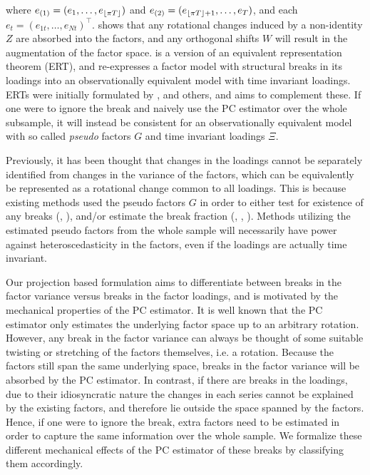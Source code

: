 \documentclass[12pt]{article}
\newcommand*{\tran}{\intercal}
\theoremstyle{plain}
\numberwithin{equation}{section}
\begin{document}
where $e_{(1)} = (e_{1}, \dots, e_{\left \lfloor \pi T \right \rfloor})$ and $e_{(2)} = (e_{\left \lfloor \pi T \right \rfloor + 1}, \dots, e_T)$, and each $e_t = (e_{1t}, \dots, e_{Nt})^\tran$.  shows that any rotational changes induced by a non-identity $Z$ are absorbed into the factors, and any orthogonal shifts $W$ will result in the augmentation of the factor space.  is a version of an equivalent representation theorem (ERT), and re-expresses a factor model with structural breaks in its loadings into an observationally equivalent model with time invariant loadings. ERTs were initially formulated by \textcite{han_tests_2015}, \textcite{baltagi_identification_2017} and others, and  aims to complement these. If one were to ignore the break and naively use the PC estimator over the whole subsample, it will instead be consistent for an observationally equivalent model with so called \emph{pseudo} factors $G$ and time invariant loadings $\Xi$.

Previously, it has been thought that changes in the loadings cannot be separately identified from changes in the variance of the factors, which can be equivalently be represented as a rotational change common to all loadings. This is because existing methods used the pseudo factors $G$ in order to either test for existence of any breaks (\textcite{han_tests_2015}, \textcite{chen_detecting_2014}), and/or estimate the break fraction (\textcite{baltagi_identification_2017}, \textcite{baltagi_estimating_2021}, \textcite{duan_quasi-maximum_2022}). 
Methods utilizing the estimated pseudo factors from the whole sample will necessarily have power against heteroscedasticity in the factors, even if the loadings are actually time invariant. 

Our projection based formulation aims to differentiate between breaks in the factor variance versus breaks in the factor loadings, and is motivated by the mechanical properties of the PC estimator. It is well known that the PC estimator only estimates the underlying factor space up to an arbitrary rotation. However, any break in the factor variance can always be thought of some suitable twisting or stretching of the factors themselves, i.e. a rotation. Because the factors still span the same underlying space, breaks in the factor variance will be absorbed by the PC estimator. In contrast, if there are breaks in the loadings, due to their idiosyncratic nature the changes in each series cannot be explained by the existing factors, and therefore lie outside the space spanned by the factors. Hence, if one were to ignore the break, extra factors need to be estimated in order to capture the same information over the whole sample. We formalize these different mechanical effects of the PC estimator of these breaks by classifying them accordingly. 
\end{document}
